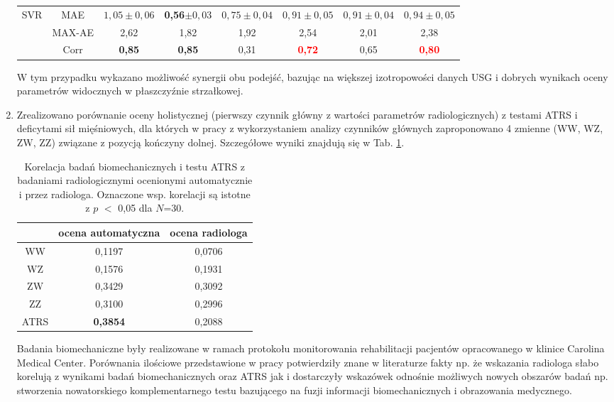 \begin{enumerate}
\begin{table}[h!]
\begin{tabular}{lc||c|c|c|c|c|c}
 		SVR & MAE & $1,05\pm0,06$ & \textbf{0,56}$\pm0,03$ & $0,75\pm0,04$ & $0,91\pm0,05$ & $0,91\pm0,04$ & $0,94\pm0,05$\\
 		& MAX-AE & 2,62 & 1,82 & 1,92 & 2,54 & 2,01 & 2,38 \\
 		& Corr   & \textbf{0,85} & \textbf{0,85} & 0,31 & \textcolor{red}{\textbf{0,72}} & 0,65 & \textcolor{red}{\textbf{0,80}} \\
 		
 	\end{tabular}
 \end{table}
 \renewcommand{\arraystretch}{1}

 W tym przypadku wykazano możliwość synergii obu podejść, bazując na większej izotropowości danych USG i dobrych wynikach oceny parametrów widocznych w płaszczyźnie strzałkowej.
 \item Zrealizowano porównanie oceny holistycznej (pierwszy czynnik główny z wartości parametrów radiologicznych) z testami ATRS i deficytami sił mięśniowych, dla których w pracy z wykorzystaniem analizy czynników głównych zaproponowano 4 zmienne (WW, WZ, ZW, ZZ) związane z pozycją kończyny dolnej. Szczegółowe wyniki znajdują się w Tab. \ref{tab:bioATRSvspredGT}. 
 \vspace{0.5 cm} 
 \begin{table}[h!]
 	\centering
 	\setlength{\tabcolsep}{3pt}
 	\setlength\extrarowheight{2pt}
 	\caption{Korelacja badań biomechanicznych i testu ATRS z badaniami radiologicznymi ocenionymi automatycznie i przez radiologa. Oznaczone wsp. korelacji są istotne z $p$ $<$ 0,05 dla $N$=30.}
 	\label{tab:bioATRSvspredGT}
 	\begin{tabular}{c|c|c}
 		&ocena automatyczna&ocena radiologa \\
 		\hline \hline
 		WW&0,1197&0,0706\\
 		\hline
 		WZ&0,1576&0,1931\\
 		\hline
 		ZW&0,3429&0,3092\\
 		\hline
 		ZZ&0,3100&0,2996\\
 		\hline
 		ATRS&\textbf{0,3854}&0,2088\\
 		
 		
 	\end{tabular}
 \end{table}
	
	Badania biomechaniczne były realizowane w ramach protokołu monitorowania rehabilitacji pacjentów opracowanego w klinice Carolina Medical Center. Porównania ilościowe przedstawione w pracy potwierdziły znane w literaturze fakty np. że wskazania radiologa słabo korelują z wynikami badań biomechanicznych oraz ATRS jak i dostarczyły wskazówek odnośnie możliwych nowych obszarów badań np. stworzenia nowatorskiego komplementarnego testu bazującego na fuzji informacji biomechanicznych i obrazowania medycznego. 

\end{enumerate}

